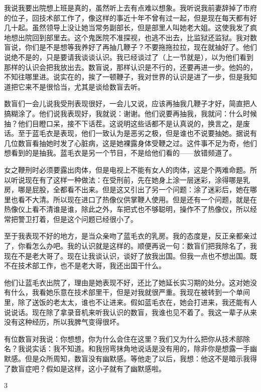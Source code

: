 我说我要出院想上班是真的，虽然听上去有点难以想象。我听说我前妻辞掉了市府的位子，回技术部工作了，像这样的事近十年不曾有过一起，但是现在每天都有好几十起。虽然领导上没让她当常务副部长，但是部里人叫她老大姐。这使我发了疯地想出院回到部里去。这个鬼医院不准探视，也逃不出去，比监狱还监狱。我对数盲说，你们是不是想等我养好了再抽几鞭子？不要拖拖拉拉，现在就抽好了。他们说绝不是的，只是要请我谈谈认识。我已经谈过了（上一节就是），以为他们看到那样的认识会把我放出去。数盲说，那样认识是不行的，还要再进一步。他妈的，不知往哪里进。说实在的，挨了一顿鞭子，我对世界的认识是进了一步，但是我知道把它来不是很恰当，尤其是谈给数盲去听。 

数盲们一会儿说我受刑表现很好，一会儿又说，应该再抽我几鞭子才好，简直把人搞糊涂了。他们说我表现好，我就说：谢谢。他们说要再抽我，我就问：什么时候抽？他们目瞪口呆，接不下话茬。这说明这些话都不是认真说的，换言之，是废话。至于蓝毛衣是表现，他们一致认为是恶劣之极，但是谁也不说要抽她。据说有几位数盲看抽她时发了心脏病，这是她裸露身体受鞭之过。这件事不足为奇，他们想看到的是抽我。蓝毛衣是另一个节目，不是给他们看的——放错频道了。 

女之鞭刑时必须要露出肉体，但是电视上不能有女人的肉体，这是个两难命题。所以听说现在有了这样一种做法：在受刑前，先在她身上涂一层迷彩，涂得哪是乳房，哪是屁股，全都看不出来。但是这又引出了另一个问题：涂了迷彩后，她在哪里也看不大清。所以现在进口了热像仪供掌鞭人使用。但是还有一个问题，就是在热像仪上看不清谁是谁，除此之外，车把式也不够聪明，操作不了热像仪，所以经常把警卫打着，但是这个问题已经很小了。 

至于我表现不好的地方，是当众亲吻了蓝毛衣的乳房。我的态度是，反正亲都亲过了，你看怎么办吧。我的认识就是这样的。顺便再说一句：数盲们把我除名了，我现在不是老大哥了。现在让我谈认识，谈好了放我出国。但我一点也不想出国。既不在技术部工作，也不是老大哥，我还出国干什么。 

他们让蓝毛衣出院了，理由是她表现不好，还比了她延长实习期的处分。这对她没有什么，我看她乐意在技术部里干，但是对我就很严重。我现在被转到一个单间里，除了送饭的老太太，谁也不让进来。假如蓝毛衣在，她会打进来，我还能有人说说话。现在除了拿录音机来听我认识的数盲，我谁也见不着了。我这一辈子从来没有这种经历，所以我脾气变得很坏。 

有位数盲对我说：你想想，你为什么会住在这里？我们又为什么把你从技术部除名？我说实话：我不知道。和我拐弯抹角地说话是没有用的，除非你是想露一手幽默感。但是众所周知，数盲没有幽默感。等他走了以后，我想：他这不是暗示我得了数盲症吧？假如是这样，这小子就有了幽默感啦。 



3 

